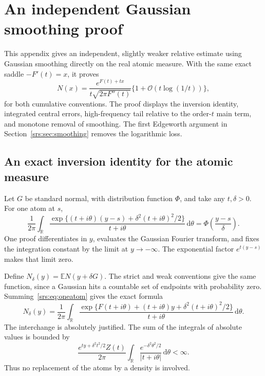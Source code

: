 \documentclass[11pt]{article}
\numberwithin{equation}{section}
\theoremstyle{remark}\newtheorem{remark}[theorem]{Remark}
\newcommand{\Oh}{\mathcal O}
\newcommand{\dd}{\,\mathrm d}
\newcommand{\R}{\mathbb R}
\begin{document}
\section{An independent Gaussian smoothing proof}\label{srs:sec:gaussian}
This appendix gives an independent, slightly weaker relative estimate using Gaussian smoothing directly on the real atomic measure. With the same exact saddle $-F'(t)=x$, it proves
\begin{equation}
 N(x)=\frac{e^{F(t)+tx}}{t\sqrt{2\pi F''(t)}}
 \{1+\Oh(t\log(1/t))\},\label{srs:eq:gaussian-saddle}
\end{equation}
for both cumulative conventions. The proof displays the inversion identity, integrated central errors, high-frequency tail relative to the order-$t$ main term, and monotone removal of smoothing. The first Edgeworth argument in Section~\ref{srs:sec:smoothing} removes the logarithmic loss.

\subsection{An exact inversion identity for the atomic measure}
Let $G$ be standard normal, with distribution function $\Phi$, and take any $t,\delta>0$. For one atom at $s$,
\begin{equation}
 \frac1{2\pi}\int_{\R}
 \frac{\exp\{(t+i\theta)(y-s)+\delta^2(t+i\theta)^2/2\}}
 {t+i\theta}\dd\theta
 =\Phi\left(\frac{y-s}{\delta}\right).
 \label{srs:eq:oneatom}
\end{equation}
One proof differentiates in $y$, evaluates the Gaussian Fourier transform, and fixes the integration constant by the limit at $y\to-\infty$. The exponential factor $e^{t(y-s)}$ makes that limit zero.

Define $N_\delta(y)=\mathbb E N(y+\delta G)$. The strict and weak conventions give the same function, since a Gaussian hits a countable set of endpoints with probability zero. Summing~\eqref{srs:eq:oneatom} gives the exact formula
\begin{equation}
 N_\delta(y)=\frac1{2\pi}\int_\R
 \frac{\exp\{F(t+i\theta)+(t+i\theta)y+\delta^2(t+i\theta)^2/2\}}
 {t+i\theta}\dd\theta.
 \label{srs:eq:inversion}
\end{equation}
The interchange is absolutely justified. The sum of the integrals of absolute values is bounded by
\[
 \frac{e^{ty+\delta^2t^2/2}Z(t)}{2\pi}
 \int_\R \frac{e^{-\delta^2\theta^2/2}}{|t+i\theta|}\dd\theta<\infty.
\]
Thus no replacement of the atoms by a density is involved.
\end{document}
